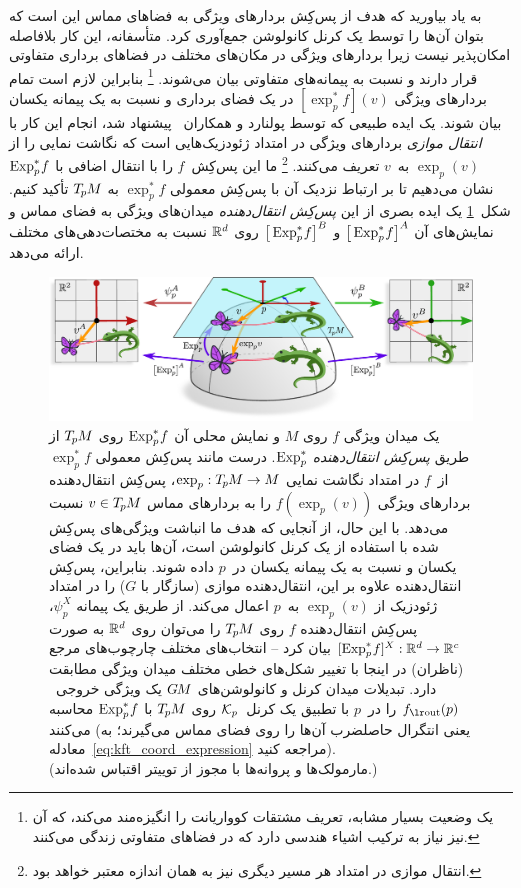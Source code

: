به یاد بیاورید که هدف از پس‌کِش بردارهای ویژگی به فضاهای مماس این است که بتوان آن‌ها را توسط یک کرنل کانولوشن جمع‌آوری کرد.
متأسفانه، این کار بلافاصله امکان‌پذیر نیست زیرا بردارهای ویژگی در مکان‌های مختلف در فضاهای برداری متفاوتی قرار دارند و نسبت به پیمانه‌های متفاوتی بیان می‌شوند.%
\footnote{
	یک وضعیت بسیار مشابه، تعریف مشتقات کوواریانت را انگیزه‌مند می‌کند، که آن نیز نیاز به ترکیب اشیاء هندسی دارد که در فضاهای متفاوتی زندگی می‌کنند.
}
بنابراین لازم است تمام بردارهای ویژگی $[\exp_p^*f](v)$ در یک فضای برداری و نسبت به یک پیمانه یکسان بیان شوند.
یک ایده طبیعی که توسط پولنارد و همکاران~\cite{poulenard2018multi} پیشنهاد شد، انجام این کار با \emph{انتقال موازی} بردارهای ویژگی در امتداد ژئودزیک‌هایی است که نگاشت نمایی را از $\exp_p(v)$ به~$v$ تعریف می‌کنند.%
\footnote{
	انتقال موازی در امتداد هر مسیر دیگری نیز به همان اندازه معتبر خواهد بود.
}
ما این پس‌کِش~$f$ را با انتقال اضافی با $\operatorname{Exp}^*_p\mkern-2mu f$ نشان می‌دهیم تا بر ارتباط نزدیک آن با پس‌کِش معمولی $\exp_p^*f$ به $T_{\mkern-1.5mu p}\mkern-.5muM$ تأکید کنیم.
شکل~\ref{fig:pullback_field_exp_TpM} یک ایده بصری از این \emph{پس‌کِش انتقال‌دهنده} میدان‌های ویژگی به فضای مماس و نمایش‌های آن $\big[\operatorname{Exp}^*_p\mkern-2mu f\big]^A$ و $\big[\operatorname{Exp}^*_p\mkern-2mu f\big]^B$ روی $\mathbb{R}^d$ نسبت به مختصات‌دهی‌های مختلف ارائه می‌دهد.

\begin{figure}[H]
	\centering
	\includegraphics[width=\textwidth]{figures/pullback_field_exp_TpM.pdf}
	\caption{\small
		یک میدان ویژگی $f$ روی $M$ و نمایش محلی آن $\operatorname{Exp}^*_p\mkern-2mu f$ روی $T_{\mkern-1.5mu p}\mkern-.5muM$ از طریق \emph{پس‌کِش انتقال‌دهنده} $\operatorname{Exp}^*_p$.
		درست مانند پس‌کِش معمولی $\exp_p^*f$ از~$f$ در امتداد نگاشت نمایی $\exp_p: T_{\mkern-1.5mu p}\mkern-.5muM \to M$، پس‌کِش انتقال‌دهنده بردارهای ویژگی $f(\exp_p(v))$ را به بردارهای مماس $v\in T_{\mkern-1.5mu p}\mkern-.5muM$ نسبت می‌دهد.
		با این حال، از آنجایی که هدف ما انباشت ویژگی‌های پس‌کِش شده با استفاده از یک کرنل کانولوشن است، آن‌ها باید در یک فضای یکسان و نسبت به یک پیمانه یکسان در~$p$ داده شوند.
		بنابراین، پس‌کِش انتقال‌دهنده علاوه بر این، انتقال‌دهنده موازی (سازگار با $G$) را در امتداد ژئودزیک از $\exp_p(v)$ به~$p$ اعمال می‌کند.
		از طریق یک پیمانه $\psi_p^X$، پس‌کِش انتقال‌دهنده $f$ روی $T_{\mkern-1.5mu p}\mkern-.5muM$ را می‌توان روی $\mathbb{R}^d$ به صورت $[\operatorname{Exp}^*_p\mkern-2mu f]^X: \mathbb{R}^d \to \mathbb{R}^c$ بیان کرد -- انتخاب‌های مختلف چارچوب‌های مرجع (ناظران) در اینجا با تغییر شکل‌های خطی مختلف میدان ویژگی مطابقت دارد.
		تبدیلات میدان کرنل و کانولوشن‌های $G\mkern-1.4muM$ یک ویژگی خروجی~$\fout(p)$ را در~$p$ با تطبیق یک کرنل~$\mathcal{K}_p$ روی $T_{\mkern-1.5mu p}\mkern-.5muM$ با $\operatorname{Exp}^*_p\mkern-2mu f$ محاسبه می‌کنند (یعنی انتگرال حاصلضرب آن‌ها را روی فضای مماس می‌گیرند؛ به معادله~\eqref{eq:kft_coord_expression} مراجعه کنید).
		{ \\
			\color{gray}
			\scriptsize
			(مارمولک‌ها و پروانه‌ها با مجوز \href{https://github.com/twitter/twemoji/blob/gh-pages/LICENSE-GRAPHICS}{} از توییتر اقتباس شده‌اند.)
		}
	}
	\label{fig:pullback_field_exp_TpM}
\end{figure}

